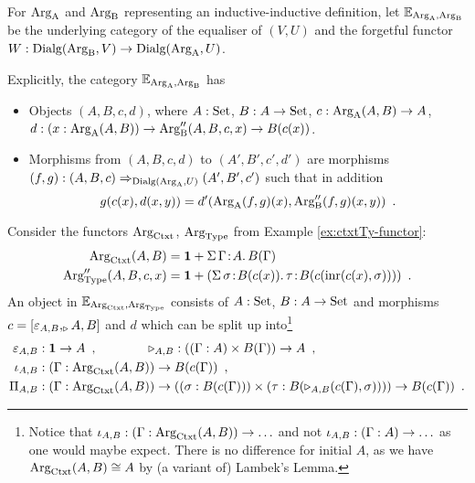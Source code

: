 \documentclass[orivec,envcountsame, ,envcountsect]{llncs}
\begin{document}
\begin{definition}
  For $\text{Arg}_{\text{A}}$ and $\text{Arg}_{\text{B}}$ representing an inductive-inductive
  definition, let $\mathbb{E}_{\text{Arg}_{\text{A}}, \text{Arg}_{\text{B}}}$ be the underlying category of
  the equaliser of $(V, U)$ and the forgetful functor ${W :
    \text{Dialg}(\text{Arg}_{\text{B}}, V) \to \text{Dialg}(\text{Arg}_{\text{A}}, U)}$.
\end{definition}
Explicitly, the category $\mathbb{E}_{\text{Arg}_{\text{A}}, \text{Arg}_{\text{B}}}$ has
\begin{itemize}
\item Objects $(A, B, c, d)$, where $A : \text{Set}$, $B : A \to \text{Set}$, $c : \text{Arg}_{\text{A}}(A, B) \to A$, $d : (x : \text{Arg}_{\text{A}}(A, B)) \to \text{Arg}_{\text{B}}''(A, B, c, x) \to B(c(x))$.
\item Morphisms from $(A, B, c, d)$ to $(A', B', c', d')$ are morphisms \\ $(f, g) :
  (A, B, c) \Rightarrow_{\text{Dialg}(\text{Arg}_{\text{A}}, U)} (A', B', c')$ such that in addition
  \[
  g(c(x), d(x, y)) = d'(\text{Arg}_{\text{A}}(f,g)(x), \text{Arg}_{\text{B}}''(f,g)(x, y)) \enspace .
  \]
\end{itemize}


\begin{example}
  Consider the functors $\text{Arg}_{\text{Ctxt}}$, $\text{Arg}_{\text{Type}}$ from Example \ref{ex:ctxtTy-functor}:
\begin{align*}
  \text{Arg}_{\text{Ctxt}}(A, B) &= \mathbf{1} + \Sigma\, \Gamma\!:\!A .\, B(\Gamma)\\
  \text{Arg}_{\text{Type}}''(A, B, c, x) &= \mathbf{1} + (\Sigma\,  \sigma\!:\! B(c(x)).\, \tau\!:\!B(c(\text{inr}(c(x), \sigma))) ) \enspace .
\end{align*}
An object in $\mathbb{E}_{\text{Arg}_{\text{Ctxt}}, \text{Arg}_{\text{Type}}}$ consists of $A : \text{Set}$, $B :
A \to \text{Set}$ and morphisms $c =
[\varepsilon_{A,B}, _ {\triangleright} A,B]$ and $d$ which can be
split up into\footnote{Notice that $\iota_{A,B} : (\Gamma :
  \text{Arg}_{\text{Ctxt}}(A, B)) \to \ldots$ and not $\iota_{A,B} : (\Gamma :
  A) \to \ldots$ as one would maybe expect. There is no difference for
  initial $A$, as we have $\text{Arg}_{\text{Ctxt}}(A, B) \cong A$ by (a
  variant of) Lambek's Lemma.}
\begin{align*}
  \varepsilon_{A,B} &: \mathbf{1} \to A \enspace , \qquad\qquad \triangleright_{A,B} : ((\Gamma : A) \times B(\Gamma)) \to A  \enspace , \\
\iota_{A,B} &: (\Gamma : \text{Arg}_{\text{Ctxt}}(A, B)) \to B(c(\Gamma)) \enspace , \\
\Pi_{A,B} &: (\Gamma : \text{Arg}_{\text{Ctxt}}(A, B)) \to ((\sigma : B(c(\Gamma))) \times (\tau : B(\triangleright_{A,B}(c(\Gamma), \sigma)))) \to B(c(\Gamma)) \enspace.
\end{align*}
\end{example}
\end{document}
